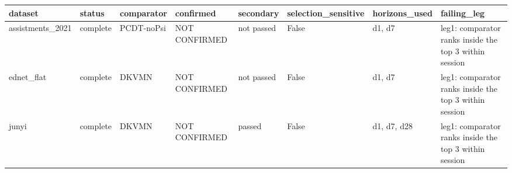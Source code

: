 \begin{tabular}{llllllll}
\toprule
dataset & status & comparator & confirmed & secondary & selection\_sensitive & horizons\_used & failing\_leg \\
\midrule
assistments\_2021 & complete & PCDT-noPsi & NOT CONFIRMED & not passed & False & d1, d7 & leg1: comparator ranks inside the top 3 within session \\
ednet\_flat & complete & DKVMN & NOT CONFIRMED & not passed & False & d1, d7 & leg1: comparator ranks inside the top 3 within session \\
junyi & complete & DKVMN & NOT CONFIRMED & passed & False & d1, d7, d28 & leg1: comparator ranks inside the top 3 within session \\
\bottomrule
\end{tabular}
